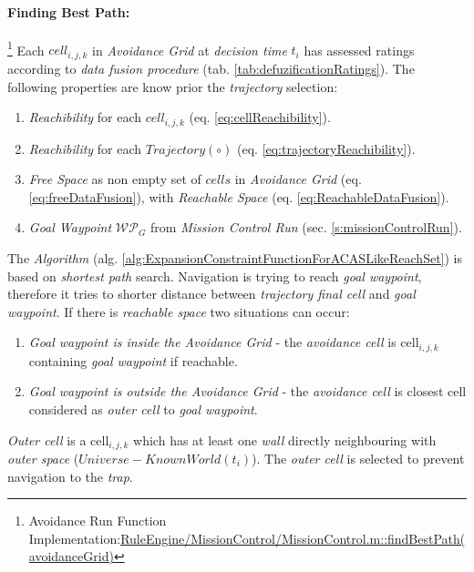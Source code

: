 \paragraph{Finding Best Path:} \footnote{Avoidance Run Function Implementation:\url{RuleEngine/MissionControl/MissionControl.m::findBestPath(avoidanceGrid)}} Each $cell_{i,j,k}$ in \emph{Avoidance Grid} at \emph{decision time} $t_i$ has assessed ratings according to \emph{data fusion procedure} (tab. \ref{tab:defuzificationRatings}). The following properties are know prior the \emph{trajectory} selection:
\begin{enumerate}
    \item \emph{Reachibility} for each  $cell_{i,j,k}$ (eq. \ref{eq:cellReachibility}).
    \item \emph{Reachibility} for each  $Trajectory(\circ)$ (eq. \ref{eq:trajectoryReachibility}).
    \item \emph{Free Space} as non empty set of $cells$ in \emph{Avoidance Grid} (eq. \ref{eq:freeDataFusion}), with \emph{Reachable Space} (eq. \ref{eq:ReachableDataFusion}).
    \item \emph{Goal Waypoint} $\mathscr{WP}_G$ from \emph{Mission Control Run} (sec. \ref{s:missionControlRun}).
\end{enumerate}

The \emph{Algorithm} (alg. \ref{alg:ExpansionConstraintFunctionForACASLikeReachSet}) is based on \emph{shortest path} search. Navigation is trying to reach \emph{goal waypoint}, therefore it tries to shorter distance between \emph{trajectory final cell} and \emph{goal waypoint}. If there is \emph{reachable space} two situations can occur:
\begin{enumerate}
    \item \emph{Goal waypoint is inside the Avoidance Grid} - the \emph{avoidance cell} is cell$_{i,j,k}$ containing \emph{goal waypoint} if reachable. 
    
    \item \emph{Goal waypoint is outside the Avoidance Grid} - the \emph{avoidance cell} is closest cell considered as \emph{outer cell} to \emph{goal waypoint}.
\end{enumerate}

\begin{note}
    \emph{Outer cell} is a cell$_{i,j,k}$ which has at least one \emph{wall} directly neighbouring with \emph{outer space} ($Universe - Known World (t_i)$). The \emph{outer cell} is selected to prevent navigation to the \emph{trap}.
\end{note}

